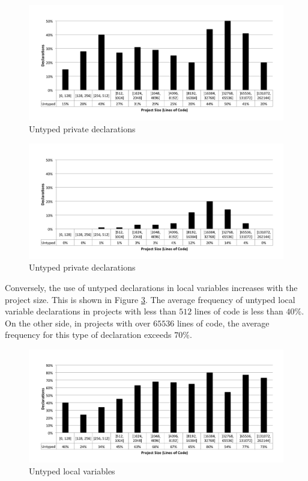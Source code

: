 \documentclass[preprint]{sigplanconf}
\begin{document}
\begin{figure}[ht]
\centering 
\includegraphics[width=1\textwidth]{size_priMethodReturn} 
\caption{Untyped private declarations}
\label{fig:size_priMethodReturn} 
\end{figure}

\begin{figure}[ht]
\centering 
\includegraphics[width=1\textwidth]{size_proMethodReturn} 
\caption{Untyped private declarations}
\label{fig:size_proMethodReturn} 
\end{figure}

Conversely, the use of untyped declarations in local variables increases with the project size. 
This is shown in Figure \ref{fig:size_localVariable}. 
The average frequency of untyped local variable declarations in projects with less than $512$ lines of code is less than $40\%$. 
On the other side, in projects with over $65536$ lines of code, the average frequency for this type of declaration exceeds $70\%$.

\begin{figure}[ht]
\centering 
\includegraphics[width=1\textwidth]{size_localVariable} 
\caption{Untyped local variables}
\label{fig:size_localVariable} 
\end{figure}
\end{document}
